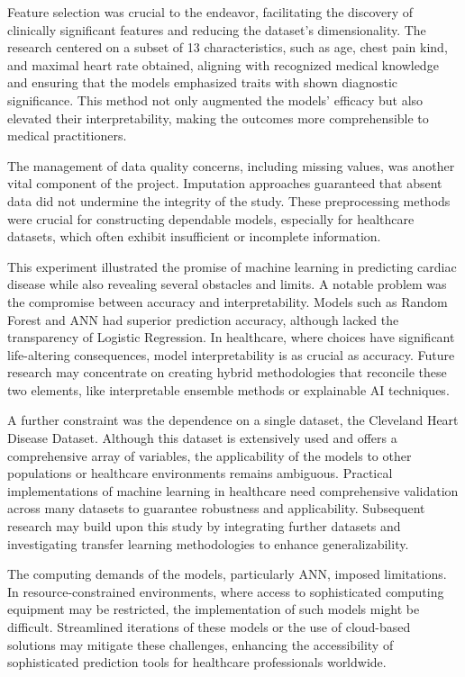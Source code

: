 Feature selection was crucial to the endeavor, facilitating the discovery of clinically significant features and reducing the dataset's dimensionality. The research centered on a subset of 13 characteristics, such as age, chest pain kind, and maximal heart rate obtained, aligning with recognized medical knowledge and ensuring that the models emphasized traits with shown diagnostic significance. This method not only augmented the models' efficacy but also elevated their interpretability, making the outcomes more comprehensible to medical practitioners.

The management of data quality concerns, including missing values, was another vital component of the project. Imputation approaches guaranteed that absent data did not undermine the integrity of the study. These preprocessing methods were crucial for constructing dependable models, especially for healthcare datasets, which often exhibit insufficient or incomplete information.

This experiment illustrated the promise of machine learning in predicting cardiac disease while also revealing several obstacles and limits. A notable problem was the compromise between accuracy and interpretability. Models such as Random Forest and ANN had superior prediction accuracy, although lacked the transparency of Logistic Regression. In healthcare, where choices have significant life-altering consequences, model interpretability is as crucial as accuracy. Future research may concentrate on creating hybrid methodologies that reconcile these two elements, like interpretable ensemble methods or explainable AI techniques.

A further constraint was the dependence on a single dataset, the Cleveland Heart Disease Dataset. Although this dataset is extensively used and offers a comprehensive array of variables, the applicability of the models to other populations or healthcare environments remains ambiguous. Practical implementations of machine learning in healthcare need comprehensive validation across many datasets to guarantee robustness and applicability. Subsequent research may build upon this study by integrating further datasets and investigating transfer learning methodologies to enhance generalizability.

The computing demands of the models, particularly ANN, imposed limitations. In resource-constrained environments, where access to sophisticated computing equipment may be restricted, the implementation of such models might be difficult. Streamlined iterations of these models or the use of cloud-based solutions may mitigate these challenges, enhancing the accessibility of sophisticated prediction tools for healthcare professionals worldwide.

